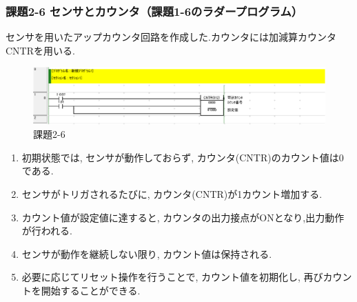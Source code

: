 \subsubsection*{課題2-6 センサとカウンタ（課題1-6のラダープログラム）}
センサを用いたアップカウンタ回路を作成した.カウンタには加減算カウンタCNTRを用いる.
\begin{figure}[H]
  \centering
  \includegraphics[scale=1]{sozai/2-6-crop.pdf}
  \caption{課題2-6}
\end{figure}
\begin{enumerate}
  \item 初期状態では, センサが動作しておらず, カウンタ(CNTR)のカウント値は0である.
  \item センサがトリガされるたびに, カウンタ(CNTR)が1カウント増加する.
  \item カウント値が設定値に達すると, カウンタの出力接点がONとなり,出力動作が行われる.
  \item センサが動作を継続しない限り, カウント値は保持される.
  \item 必要に応じてリセット操作を行うことで, カウント値を初期化し, 再びカウントを開始することができる.
\end{enumerate}


